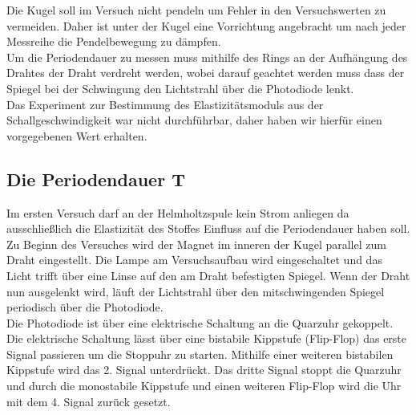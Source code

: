 Die Kugel soll im Versuch nicht pendeln um Fehler in den Versuchswerten zu vermeiden.
Daher ist unter der Kugel eine Vorrichtung angebracht um nach jeder Messreihe die Pendelbewegung zu dämpfen.\\

Um die Periodendauer zu messen muss mithilfe des Rings an der Aufhängung des Drahtes der Draht verdreht werden,
wobei darauf geachtet werden muss dass der Spiegel bei der Schwingung den Lichtstrahl über die Photodiode lenkt.\\

Das Experiment zur Bestimmung des Elastizitätsmoduls aus der Schallgeschwindigkeit war nicht durchführbar,
daher haben wir hierfür einen vorgegebenen Wert erhalten.\\

\subsection{Die Periodendauer T}
Im ersten Versuch darf an der Helmholtzspule kein Strom anliegen da ausschließlich die Elastizität des Stoffes
 Einfluss auf die Periodendauer haben soll.
Zu Beginn des Versuches wird der Magnet im inneren der Kugel parallel zum Draht eingestellt.
Die Lampe am Versuchsaufbau wird eingeschaltet und das Licht trifft über eine Linse auf den am Draht befestigten Spiegel.
Wenn der Draht nun ausgelenkt wird, läuft der Lichtstrahl über den mitschwingenden Spiegel periodisch über die Photodiode.\\
Die Photodiode ist über eine elektrische Schaltung an die Quarzuhr gekoppelt.
Die elektrische Schaltung lässt über eine bistabile Kippstufe (Flip-Flop) das erste Signal passieren um die Stoppuhr zu starten.
Mithilfe einer weiteren bistabilen Kippstufe wird das 2. Signal unterdrückt.
Das dritte Signal stoppt die Quarzuhr und durch die monostabile Kippstufe und einen weiteren Flip-Flop wird die Uhr mit dem 4. Signal zurück gesetzt.\\
